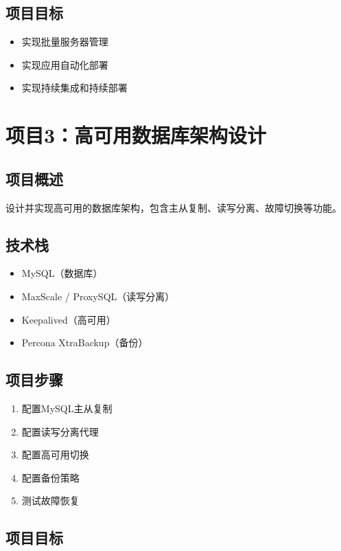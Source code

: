 \documentclass[12pt,UTF8]{ctexbook}
\begin{document}
\subsection*{项目目标}

\begin{itemize}
    \item 实现批量服务器管理
    \item 实现应用自动化部署
    \item 实现持续集成和持续部署
\end{itemize}

\section{项目3：高可用数据库架构设计}
\label{sec:project-db-ha}

\subsection*{项目概述}

设计并实现高可用的数据库架构，包含主从复制、读写分离、故障切换等功能。

\subsection*{技术栈}

\begin{itemize}
    \item MySQL（数据库）
    \item MaxScale / ProxySQL（读写分离）
    \item Keepalived（高可用）
    \item Percona XtraBackup（备份）
\end{itemize}

\subsection*{项目步骤}

\begin{enumerate}
    \item 配置MySQL主从复制
    \item 配置读写分离代理
    \item 配置高可用切换
    \item 配置备份策略
    \item 测试故障恢复
\end{enumerate}

\subsection*{项目目标}
\end{document}
